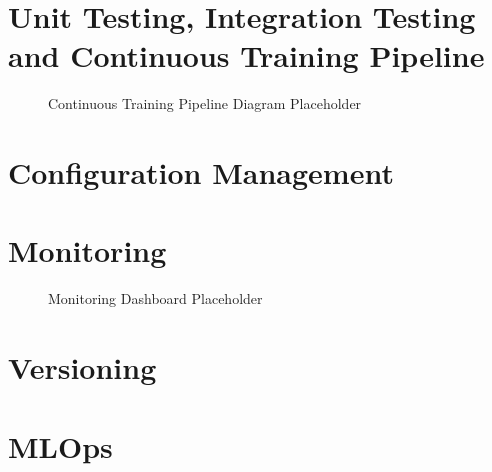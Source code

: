 \documentclass[12pt, a4paper]{report}
\begin{document}
\lipsum[30][1-3]

\section{Unit Testing, Integration Testing and Continuous Training Pipeline}

\lipsum[31][1-4]

\begin{figure}[H]
    \centering
    \fbox{\rule{0pt}{4cm}\rule{0.75\textwidth}{0pt}}
    \caption{Continuous Training Pipeline Diagram Placeholder}
    \label{fig:ct-pipeline}
\end{figure}

\lipsum[32][1-2]

\section{Configuration Management}

\lipsum[33][1-4]

\section{Monitoring}

\lipsum[34][1-4]

\begin{figure}[H]
    \centering
    \fbox{\rule{0pt}{4cm}\rule{0.75\textwidth}{0pt}}
    \caption{Monitoring Dashboard Placeholder}
    \label{fig:monitoring}
\end{figure}

\lipsum[35][1-2]

\section{Versioning}

\lipsum[36][1-4]

\section{MLOps}

\lipsum[37][1-4]
\end{document}
